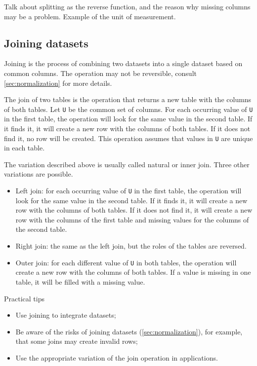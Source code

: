 {\color{red} Talk about splitting as the reverse function, and the reason why missing
columns may be a problem. Example of the unit of measurement.}

\subsection{Joining datasets}

Joining is the process of combining two datasets into a single dataset based on common
columns.  The operation may not be reversible, consult \cref{sec:normalization} for more
details.

The join of two tables is the operation that returns a new table with the columns of both
tables.  Let \texttt{U} be the common set of columns.  For each occurring value of
\texttt{U} in the first table, the operation will look for the same value in the second
table.  If it finds it, it will create a new row with the columns of both tables.  If it
does not find it, no row will be created.  This operation assumes that values in \texttt{U}
are unique in each table.

The variation described above is usually called natural or inner join.  Three other
variations are possible.
\begin{itemize}
  \item Left join: for each occurring value of \texttt{U} in the first table, the operation
    will look for the same value in the second table.  If it finds it, it will create a new
    row with the columns of both tables.  If it does not find it, it will create a new row
    with the columns of the first table and missing values for the columns of the second
    table.
  \item Right join: the same as the left join, but the roles of the tables are reversed.
  \item Outer join: for each different value of \texttt{U} in both tables, the operation
    will create a new row with the columns of both tables.  If a value is missing in one
    table, it will be filled with a missing value.
\end{itemize}

\begin{hlbox}{Practical tips}
  \begin{itemize}
    \item Use joining to integrate datasets;
    \item Be aware of the risks of joining datasets (\cref{sec:normalization}), for
      example, that some joins may create invalid rows;
    \item Use the appropriate variation of the join operation in applications.
  \end{itemize}
\end{hlbox}

